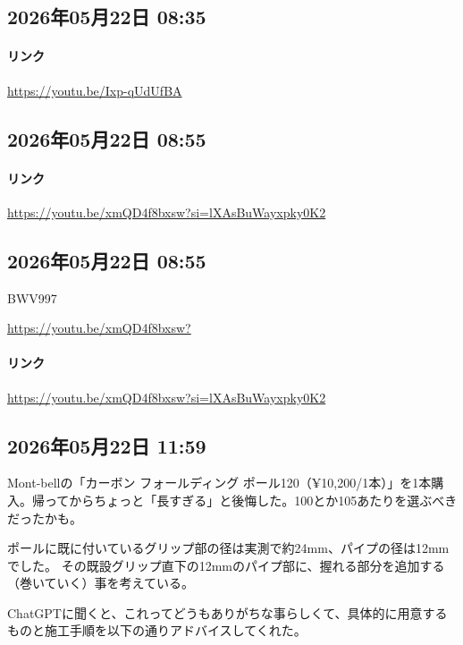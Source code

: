\subsection*{2026年05月22日 08:35}

\paragraph{リンク}
\url{https://youtu.be/Ixp-qUdUfBA}

\subsection*{2026年05月22日 08:55}

\paragraph{リンク}
\url{https://youtu.be/xmQD4f8bxsw?si=lXAsBuWayxpky0K2}

\subsection*{2026年05月22日 08:55}

BWV997

\url{https://youtu.be/xmQD4f8bxsw?}

\paragraph{リンク}
\url{https://youtu.be/xmQD4f8bxsw?si=lXAsBuWayxpky0K2}

\subsection*{2026年05月22日 11:59}

Mont-bellの「カーボン フォールディング ポール120（¥10,200/1本）」を1本購入。帰ってからちょっと「長すぎる」と後悔した。100とか105あたりを選ぶべきだったかも。

ポールに既に付いているグリップ部の径は実測で約24mm、パイプの径は12mmでした。 その既設グリップ直下の12mmのパイプ部に、握れる部分を追加する（巻いていく）事を考えている。

ChatGPTに聞くと、これってどうもありがちな事らしくて、具体的に用意するものと施工手順を以下の通りアドバイスしてくれた。

